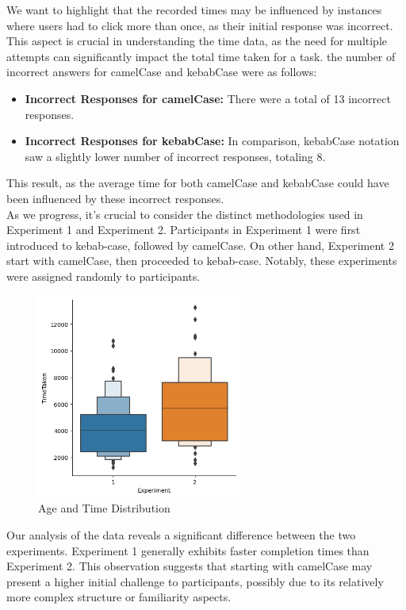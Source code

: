 \documentclass{article}
\begin{document}
We want to highlight that the recorded times may be influenced by instances where users had to click more than once, as their initial response was incorrect. This aspect is crucial in understanding the time data, as the need for multiple attempts can significantly impact the total time taken for a task. the number of incorrect answers for camelCase and kebabCase were as follows:

\begin{itemize}
    \item \textbf{Incorrect Responses for camelCase:} There were a total of 13 incorrect responses.
    \item \textbf{Incorrect Responses for kebabCase:} In comparison, kebabCase notation saw a slightly lower number of incorrect responses, totaling 8.
\end{itemize}

This result, as the average time for both camelCase and kebabCase could have been influenced by these incorrect responses.\\


As we progress, it's crucial to consider the distinct methodologies used in Experiment 1 and Experiment 2. Participants in Experiment 1 were first introduced to kebab-case, followed by camelCase. On other hand, Experiment 2 start with camelCase, then proceeded to kebab-case. Notably, these experiments were assigned randomly to participants.

\begin{figure}[H]
    \centering
    \includegraphics[width=0.6\textwidth]{difference_experiment.png}
    \caption{Age and Time Distribution}
\end{figure}

Our analysis of the data reveals a significant difference between the two experiments. Experiment 1 generally exhibits faster completion times than Experiment 2. This observation suggests that starting with camelCase may present a higher initial challenge to participants, possibly due to its relatively more complex structure or familiarity aspects.
\end{document}
